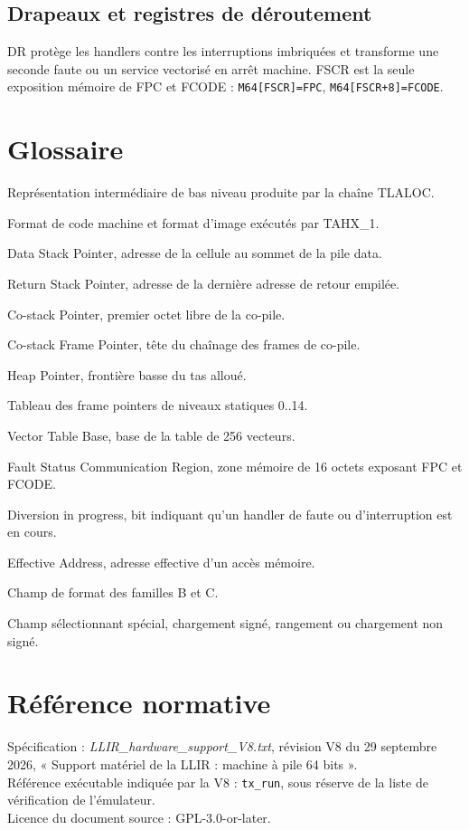 \documentclass[10pt,a4paper,twoside,openany]{book}
\newcommand{\reg}[1]{\textsc{#1}}
\newcommand{\sourceviii}{\textit{LLIR\_hardware\_support\_V8.txt}}
\begin{document}
\section{Drapeaux et registres de déroutement}
\reg{DR} protège les handlers contre les interruptions imbriquées et transforme une seconde faute ou un service vectorisé en arrêt machine. \reg{FSCR} est la seule exposition mémoire de \reg{FPC} et \reg{FCODE} : \texttt{M64[FSCR]=FPC}, \texttt{M64[FSCR+8]=FCODE}.

\chapter{Glossaire}
\begin{description}[style=nextline,leftmargin=28mm]
\item[LLIR] Représentation intermédiaire de bas niveau produite par la chaîne TLALOC.
\item[HX] Format de code machine et format d'image exécutés par TAHX\_1.
\item[DSP] Data Stack Pointer, adresse de la cellule au sommet de la pile data.
\item[RSP] Return Stack Pointer, adresse de la dernière adresse de retour empilée.
\item[CSP] Co-stack Pointer, premier octet libre de la co-pile.
\item[CFP] Co-stack Frame Pointer, tête du chaînage des frames de co-pile.
\item[HP] Heap Pointer, frontière basse du tas alloué.
\item[DISPLAY] Tableau des frame pointers de niveaux statiques 0..14.
\item[VTB] Vector Table Base, base de la table de 256 vecteurs.
\item[FSCR] Fault Status Communication Region, zone mémoire de 16 octets exposant FPC et FCODE.
\item[DR] Diversion in progress, bit indiquant qu'un handler de faute ou d'interruption est en cours.
\item[EA] Effective Address, adresse effective d'un accès mémoire.
\item[FMT] Champ de format des familles B et C.
\item[MODE] Champ sélectionnant spécial, chargement signé, rangement ou chargement non signé.
\end{description}

\chapter*{Référence normative}
Spécification : \sourceviii{}, révision V8 du 29 septembre 2026, « Support matériel de la LLIR : machine à pile 64 bits ».\\
Référence exécutable indiquée par la V8 : \texttt{tx\_run}, sous réserve de la liste de vérification de l'émulateur.\\
Licence du document source : GPL-3.0-or-later.
\end{document}
